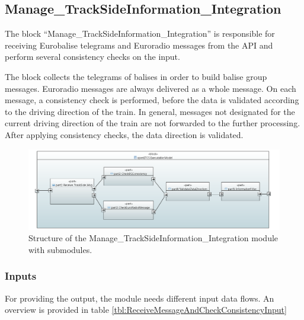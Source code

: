 \subsection{Manage\_TrackSideInformation\_Integration}

The block ``Manage\_TrackSideInformation\_Integration'' is responsible for receiving Eurobalise telegrams and Euroradio messages from the API and perform several consistency checks on the input.

The block collects the telegrams of balises in order to build balise group messages. Euroradio messages are always delivered as a whole message. On each message, a consistency check is performed, before the data is validated according to the driving direction of the train. In general, messages not designated for the current driving direction of the train are not forwarded to the further processing. After applying consistency checks, the data direction is validated.


\begin{figure}
 \centering
 \includegraphics[width=\textwidth]{./images/Input-Messages4.PNG}
 \caption{Structure of the Manage\_TrackSideInformation\_Integration module with submodules.}
 \label{fig:receiveAndCheckConsistencyArch}
\end{figure}


\subsubsection{Inputs}
For providing the output, the module needs different input data flows. An overview is provided in table \ref{tbl:ReceiveMessageAndCheckConsistencyInput}

